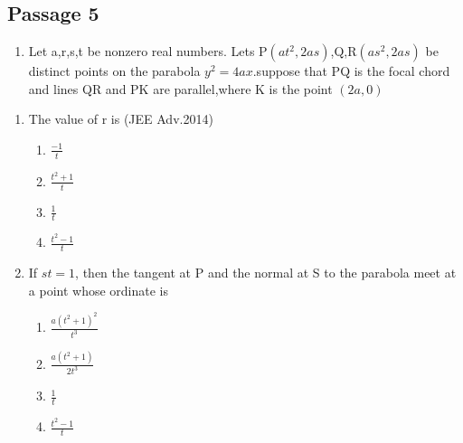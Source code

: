 \documentclass[journal,12pt,twocolumn]{IEEEtran}
\theoremstyle{remark}
\begin{document}
\subsection{Passage 5}
\begin{enumerate}
\item[] Let a,r,s,t be nonzero real numbers. Lets P$(at^2,2as)$,Q,R$(as^2,2as)$ be distinct points on the parabola $y^2=4ax$.suppose that PQ is the focal chord and lines QR and PK are parallel,where K is the point $(2a,0)$
\end{enumerate}
\begin{enumerate}
\item The value of r is 
\hfill(JEE Adv.2014)
\begin{enumerate}
    \item $\frac{-1}{t}$ 
    \item $\frac{t^2+1}{t}$
    \item $\frac{1}{t}$
    \item $\frac{t^2-1}{t}$
\end{enumerate}
\item If $st=1$, then the tangent at P and the normal at S to the
parabola meet at a point whose ordinate is 
\begin{enumerate}
    \item $\frac{a(t^2+1)^2}{t^3}$
    \item $\frac{a(t^2+1)}{2t^3}$
    \item $\frac{1}{t}$
    \item $\frac{t^2-1}{t}$
    \end{enumerate}
\end{enumerate}
\end{document}
